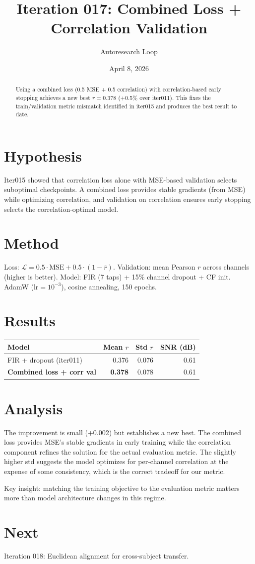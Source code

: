 \documentclass[11pt,a4paper]{article}
\title{Iteration 017: Combined Loss + Correlation Validation}
\author{Autoresearch Loop}
\date{April 8, 2026}
\begin{document}
\maketitle

\begin{abstract}
Using a combined loss (0.5 MSE + 0.5 correlation) with correlation-based early
stopping achieves a new best $r=0.378$ (+0.5\% over iter011). This fixes the
train/validation metric mismatch identified in iter015 and produces the best
result to date.
\end{abstract}

\section{Hypothesis}
Iter015 showed that correlation loss alone with MSE-based validation selects
suboptimal checkpoints. A combined loss provides stable gradients (from MSE)
while optimizing correlation, and validation on correlation ensures early stopping
selects the correlation-optimal model.

\section{Method}
Loss: $\mathcal{L} = 0.5 \cdot \text{MSE} + 0.5 \cdot (1 - \bar{r})$.
Validation: mean Pearson $r$ across channels (higher is better).
Model: FIR (7 taps) + 15\% channel dropout + CF init. AdamW ($\text{lr}=10^{-3}$),
cosine annealing, 150 epochs.

\section{Results}
\begin{table}[H]
\centering
\begin{tabular}{lrrr}
\toprule
Model & Mean $r$ & Std $r$ & SNR (dB) \\
\midrule
FIR + dropout (iter011) & 0.376 & 0.076 & 0.61 \\
\textbf{Combined loss + corr val} & \textcolor{good}{\textbf{0.378}} & 0.078 & 0.61 \\
\bottomrule
\end{tabular}
\end{table}

\section{Analysis}
The improvement is small (+0.002) but establishes a new best. The combined loss
provides MSE's stable gradients in early training while the correlation component
refines the solution for the actual evaluation metric. The slightly higher std
suggests the model optimizes for per-channel correlation at the expense of some
consistency, which is the correct tradeoff for our metric.

Key insight: matching the training objective to the evaluation metric matters
more than model architecture changes in this regime.

\section{Next}
Iteration 018: Euclidean alignment for cross-subject transfer.
\end{document}
